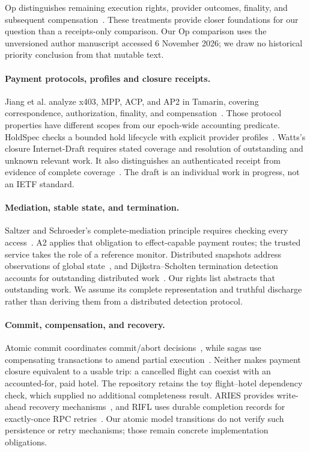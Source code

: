 \documentclass[11pt]{article}
\begin{document}
Op distinguishes remaining execution rights, provider outcomes, finality, and
subsequent compensation~\cite{op}. These treatments provide closer foundations
for our question than a receipts-only comparison. Our Op comparison uses the unversioned author manuscript accessed 6 November
2026; we draw no historical priority conclusion from that mutable text.

\paragraph{Payment protocols, profiles and closure receipts.}
Jiang et al. analyze x403, MPP, ACP, and AP2 in Tamarin, covering correspondence,
authorization, finality, and compensation~\cite{protocolanalysis}. Those protocol
properties have different scopes from our epoch-wide accounting predicate.
HoldSpec checks a bounded hold lifecycle with explicit provider
profiles~\cite{hold}. Watts's closure Internet-Draft requires stated coverage
and resolution of outstanding and unknown relevant work. It also distinguishes
an authenticated receipt from evidence of complete coverage~\cite{closuredraft}.
The draft is an individual work in progress, not an IETF standard.

\paragraph{Mediation, stable state, and termination.}
Saltzer and Schroeder's complete-mediation principle requires checking every
access~\cite{saltzer1975}. A2 applies that obligation to effect-capable payment
routes; the trusted service takes the role of a reference monitor. Distributed
snapshots address observations of global state~\cite{chandy}, and
Dijkstra--Scholten termination detection accounts for outstanding distributed
work~\cite{dijkstra1980}. Our rights list abstracts that outstanding work. We
assume its complete representation and truthful discharge rather than deriving
them from a distributed detection protocol.

\paragraph{Commit, compensation, and recovery.}
Atomic commit coordinates commit/abort decisions~\cite{gray2006}, while sagas
use compensating transactions to amend partial execution~\cite{sagas1987}.
Neither makes payment closure equivalent to a usable trip: a cancelled flight
can coexist with an accounted-for, paid hotel. The repository retains the toy
flight--hotel dependency check, which supplied no additional completeness result.
ARIES provides write-ahead recovery mechanisms~\cite{aries1992}, and RIFL uses
durable completion records for exactly-once RPC retries~\cite{rifl2015}.
Our atomic model transitions do not verify such persistence or retry mechanisms;
those remain concrete implementation obligations.
\end{document}
